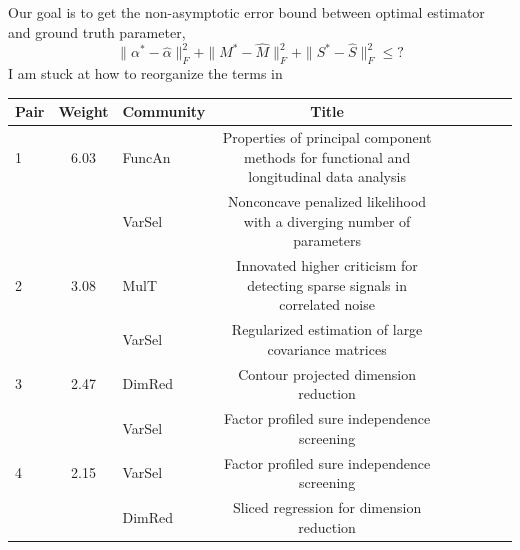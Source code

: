 \documentclass{article}
\begin{document}
Our goal is to get the non-asymptotic error bound between optimal estimator and ground truth parameter,
\[
    \|\alpha^*-\hat{\alpha}\|_{F}^{2} + 
    \|M^*-\hat{M}\|_{F}^{2} +
    \|S^*-\hat{S}\|_{F}^{2} \leq  ?
\]
I am stuck at how to reorganize the terms in 

\begin{landscape}
\begin{table}[t]
\begin{tabular}{lclclclcl}\hline 

Pair & Weight & Community & Title                                                                                  &                                                             \\\hline
1    & 6.03                      & FuncAn    & Properties of principal component methods for functional and longitudinal data analysis       &                                                             \\
     &                           & VarSel    & Nonconcave penalized likelihood with a diverging number of parameters                         &                                                             \\
2    & 3.08                      & MulT      & Innovated higher criticism for detecting sparse signals in correlated noise                   &                                                             \\
     &                           & VarSel    & Regularized estimation of large covariance matrices                                           &                                                             \\
3    & 2.47                      & DimRed    & Contour projected dimension reduction                                                         &                                                             \\
     &                           & VarSel    & Factor profiled sure independence screening                                                   &                                                             \\
4    & 2.15                      & VarSel    & Factor profiled sure independence screening                                                   &                                                             \\
     &                           & DimRed    & Sliced regression for dimension reduction                                                     &                                                             \\

\end{tabular}
\end{table}
\end{landscape}
\end{document}
